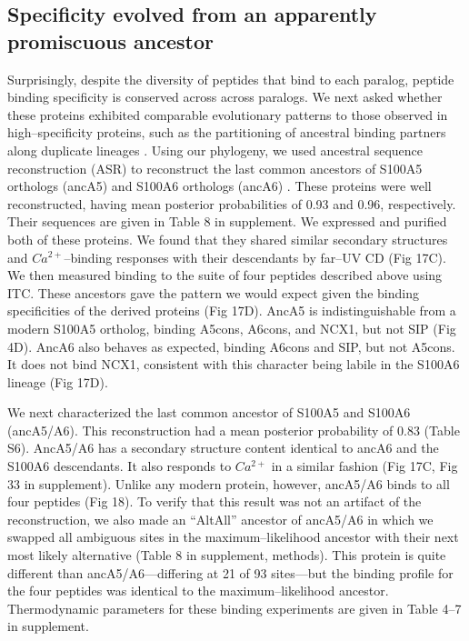 \subsection{Specificity evolved from an apparently promiscuous ancestor}

Surprisingly, despite the diversity of peptides that bind to each
paralog, peptide binding specificity is conserved across across paralogs.
We next asked whether these proteins exhibited comparable evolutionary
patterns to those observed in high--specificity proteins, such as the
partitioning of ancestral binding partners along duplicate lineages
\citep{eick_evolution_2012,hudson_distal_2015,clifton_ancestral_2016}.
Using our phylogeny, we used ancestral sequence reconstruction (ASR)
to reconstruct the last common ancestors of S100A5 orthologs (ancA5)
and S100A6 orthologs (ancA6) \citep{yang_new_1995}. These proteins
were well reconstructed, having mean posterior probabilities of 0.93
and 0.96, respectively. Their sequences are given in Table 8 in supplement. We
expressed and purified both of these proteins. We found that they
shared similar secondary structures and $Ca^{2+}$--binding responses
with their descendants by far--UV CD (Fig 17C). We then measured binding
to the suite of four peptides described above using ITC. These ancestors
gave the pattern we would expect given the binding specificities of
the derived proteins (Fig 17D). AncA5 is indistinguishable from a modern
S100A5 ortholog, binding A5cons, A6cons, and NCX1, but not SIP (Fig
4D). AncA6 also behaves as expected, binding A6cons and SIP, but not
A5cons. It does not bind NCX1, consistent with this character being
labile in the S100A6 lineage (Fig 17D). 

We next characterized the last common ancestor of S100A5 and S100A6 (ancA5/A6).
This reconstruction had a mean posterior probability of 0.83 (Table
S6). AncA5/A6 has a secondary structure content identical to ancA6
and the S100A6 descendants. It also responds to $Ca^{2+}$ in a similar
fashion (Fig 17C, Fig 33 in supplement). Unlike any modern protein, however, ancA5/A6
binds to all four peptides (Fig 18). To verify that this result was
not an artifact of the reconstruction, we also made an ``AltAll''
ancestor of ancA5/A6 in which we swapped all ambiguous sites in the
maximum--likelihood ancestor with their next most likely alternative
\citep{eick_robustness_2017} (Table 8 in supplement, methods). This protein is
quite different than ancA5/A6---differing at 21 of 93 sites---but the
binding profile for the four peptides was identical to the maximum--likelihood
ancestor. Thermodynamic parameters for these binding experiments are
given in Table 4--7 in supplement. 

